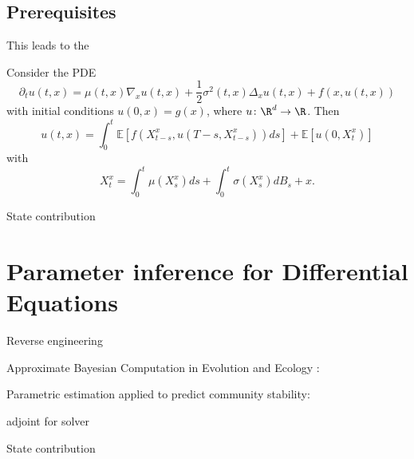 \subsection*{Prerequisites}
This leads to the 
\begin{theorem}
Consider the PDE
\begin{equation}
    \partial_t u(t,x) = \mu(t, x) \nabla_x u(t,x) + \frac{1}{2} \sigma^2(t, x) \Delta_x u(t,x) + f(x, u(t,x))
\end{equation}
with initial conditions $u(0, x) = g(x)$, where $u \colon \R^d \to \R$. 
Then
\begin{equation}
    u(t, x) = \int_0^t \mathbb{E} \left[ f(X^x_{t - s}, u(T-s, X^x_{t - s}))ds \right] + \mathbb{E} \left[ u(0, X^x_t) \right] \tag{3}
\end{equation}
with 
\begin{equation}
    X_t^x = \int_0^t \mu(X_s^x)ds + \int_0^t\sigma(X_s^x)dB_s + x.
\end{equation}

\end{theorem}

State contribution

\section*{Parameter inference for Differential Equations}

Reverse engineering

Approximate Bayesian Computation in Evolution and Ecology : \cite{Beaumont2010}

Parametric estimation applied to predict community stability: \cite{Cenci2019}

adjoint for solver 

State contribution
